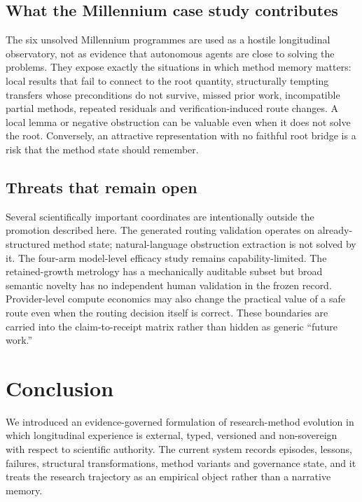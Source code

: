 \subsection{What the Millennium case study contributes}

The six unsolved Millennium programmes are used as a hostile longitudinal observatory, not as evidence that autonomous agents are close to solving the problems.  They expose exactly the situations in which method memory matters: local results that fail to connect to the root quantity, structurally tempting transfers whose preconditions do not survive, missed prior work, incompatible partial methods, repeated residuals and verification-induced route changes.  A local lemma or negative obstruction can be valuable even when it does not solve the root.  Conversely, an attractive representation with no faithful root bridge is a risk that the method state should remember.

\subsection{Threats that remain open}

Several scientifically important coordinates are intentionally outside the promotion described here.  The generated routing validation operates on already-structured method state; natural-language obstruction extraction is not solved by it.  The four-arm model-level efficacy study remains capability-limited.  The retained-growth metrology has a mechanically auditable subset but broad semantic novelty has no independent human validation in the frozen record.  Provider-level compute economics may also change the practical value of a safe route even when the routing decision itself is correct.  These boundaries are carried into the claim-to-receipt matrix rather than hidden as generic ``future work.''

\section{Conclusion}

We introduced an evidence-governed formulation of research-method evolution in which longitudinal experience is external, typed, versioned and non-sovereign with respect to scientific authority.  The current system records episodes, lessons, failures, structural transformations, method variants and governance state, and it treats the research trajectory as an empirical object rather than a narrative memory.

